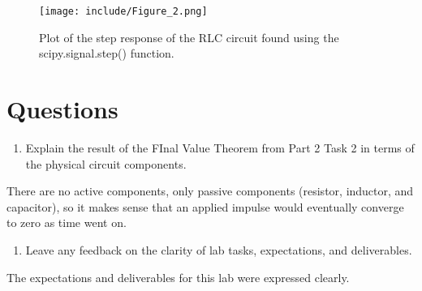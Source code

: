 \documentclass[12pt]{article}
\begin{document}
    \begin{figure}
        \centering
        \texttt{[image: include/Figure\_2.png]}
        \caption{Plot of the step response of the RLC circuit found using the scipy.signal.step() function.}
    \end{figure}
    
\newpage
\section*{Questions}

\begin{enumerate}
    \item Explain the result of the FInal Value Theorem from Part 2 Task 2 in terms of the physical circuit components.
\end{enumerate}
    \par There are no active components, only passive components (resistor, inductor, and capacitor), so it makes sense that an applied impulse would eventually converge to zero as time went on.
    
\begin{enumerate}[continue]
    \item Leave any feedback on the clarity of lab tasks, expectations, and deliverables.
\end{enumerate}
    \par The expectations and deliverables for this lab were expressed clearly.
    
\end{document}

